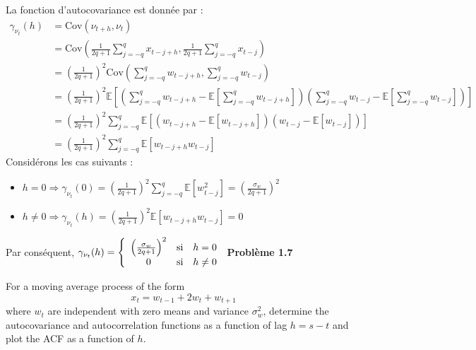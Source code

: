 \documentclass{homework}
\begin{document}
La fonction d'autocovariance est donnée par :
\begin{align*}
\gamma_{\nu_t}(h) &= \text{Cov}(\nu_{t+h}, \nu_t) \\
          &= \text{Cov}\left( \frac{1}{2q + 1}\sum_{j=-q}^{q}x_{t-j+h}, \frac{1}{2q + 1}\sum_{j=-q}^{q}x_{t-j} \right) \\
          &= \left( \frac{1}{2q + 1} \right)^2 \text{Cov} \left( \sum_{j=-q}^{q}w_{t-j+h}, \sum_{j=-q}^{q}w_{t-j} \right) \\
          &= \left( \frac{1}{2q + 1} \right)^2 \mathbb{E}\left[ \left( \sum_{j=-q}^{q}w_{t-j+h} - \mathbb{E} \left[ \sum_{j=-q}^{q}w_{t-j+h} \right] \right) \left( \sum_{j=-q}^{q}w_{t-j} - \mathbb{E}\left[ \sum_{j=-q}^{q}w_{t-j} \right] \right) \right] \\
          &= \left( \frac{1}{2q + 1} \right)^2 \sum_{j=-q}^q \mathbb{E}\left[ \left( w_{t-j+h} - \mathbb{E}[w_{t-j+h}] \right) \left( w_{t-j} - \mathbb{E}[w_{t-j}] \right) \right] \\
          &= \left( \frac{1}{2q + 1} \right)^2 \sum_{j=-q}^q \mathbb{E}\left[ w_{t-j+h}w_{t-j} \right]
\end{align*}
Considérons les cas suivants :
\begin{itemize}
    \item[\textbullet] $h = 0 \Rightarrow \gamma_{\nu_t}(0) = \left( \frac{1}{2q + 1} \right)^2 \sum_{j=-q}^q \mathbb{E}\left[ w_{t-j}^2 \right] = \left( \frac{\sigma_w}{2q + 1} \right)^2$
    \item[\textbullet] $h \neq 0 \Rightarrow \gamma_{\nu_t}(h) = \left( \frac{1}{2q + 1} \right)^2 \mathbb{E}\left[ w_{t-j+h}w_{t-j} \right] = 0$
\end{itemize}
Par conséquent, 
$
\gamma_{\nu_t}(h) = 
\left\{
\begin{array}{c c l}
    \left( \frac{\sigma_w}{2q + 1} \right)^2  & \text{si} & h = 0\\
                 0                            & \text{si} & h \neq 0
\end{array}
\right.
$
\newpage
\textbf{\Large{Problème 1.7}}

For a moving average process of the form
$$x_t = w_{t-1} + 2w_t + w_{t+1}$$
where $w_t$ are independent with zero means and variance $\sigma^2_w$, determine the autocovariance and autocorrelation functions as a function of lag $h = s-t$ and plot the ACF as a function of $h$.
\end{document}
